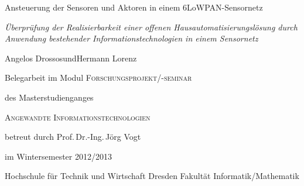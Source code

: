 \begin{titlepage}
	\sffamily
	\parbox[b][\textheight]{\dimexpr\textwidth-5em}{
		\raggedleft
		\vspace{2em}
		{\Huge Ansteuerung der Sensoren und Aktoren in einem
		6LoWPAN-Sensornetz\par}
		\vspace{1em}
		{\Large\itshape Überprüfung der Realisierbarkeit einer offenen
		Hausautomatisierungslösung durch Anwendung bestehender
		Informationstechnologien in einem Sensornetz\par}
		\vspace{2em}
		{Angelos Drossos\linebreak und\linebreak Hermann Lorenz\par}

		\vfill

		Belegarbeit im Modul\linebreak
		{\scshape\Large Forschungsprojekt/-seminar}

		\vspace{1cm}

		des Masterstudienganges\linebreak
		{\scshape\Large Angewandte Informationstechnologien\par}

		\vspace{1cm}

		betreut durch Prof.\,Dr.-Ing.\,Jörg Vogt

		im Wintersemester 2012/2013

		\vfill

		Hochschule für Technik und Wirtschaft Dresden\linebreak
		Fakultät Informatik/Mathematik
	}
\end{titlepage}
